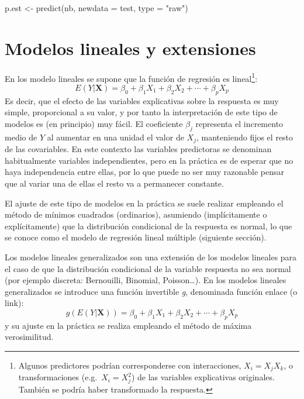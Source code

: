 \documentclass[
]{book}
\newenvironment{Shaded}{\begin{snugshade}}{\end{snugshade}}
\newcommand{\AttributeTok}[1]{\textcolor[rgb]{0.77,0.63,0.00}{#1}}
\newcommand{\FunctionTok}[1]{\textcolor[rgb]{0.00,0.00,0.00}{#1}}
\newcommand{\NormalTok}[1]{#1}
\newcommand{\OtherTok}[1]{\textcolor[rgb]{0.56,0.35,0.01}{#1}}
\newcommand{\StringTok}[1]{\textcolor[rgb]{0.31,0.60,0.02}{#1}}
\theoremstyle{break}
\theoremstyle{definition}
\theoremstyle{definition}
\theoremstyle{definition}
\theoremstyle{definition}
\theoremstyle{remark}
\begin{document}
\begin{Shaded}
\begin{Highlighting}[]
\NormalTok{p.est }\OtherTok{\textless{}{-}} \FunctionTok{predict}\NormalTok{(nb, }\AttributeTok{newdata =}\NormalTok{ test, }\AttributeTok{type =} \StringTok{"raw"}\NormalTok{)}
\end{Highlighting}
\end{Shaded}

\hypertarget{modelos-lineales}{%
\chapter{Modelos lineales y extensiones}\label{modelos-lineales}}

En los modelo lineales se supone que la función de regresión es lineal\footnote{Algunos predictores podrían corresponderse con interacciones, \(X_i = X_j X_k\), o transformaciones (e.g.~\(X_i = X_j^2\)) de las variables explicativas originales. También se podría haber transformado la respuesta.}:
\[E( Y | \mathbf{X} ) = \beta_{0}+\beta_{1}X_{1}+\beta_{2}X_{2}+\cdots+\beta_{p}X_{p}\]
Es decir, que el efecto de las variables explicativas sobre la respuesta es muy simple, proporcional a su valor, y por tanto la interpretación de este tipo de modelos es (en principio) muy fácil.
El coeficiente \(\beta_j\) representa el incremento medio de \(Y\) al aumentar en una unidad el valor de \(X_j\), manteniendo fijos el resto de las covariables.
En este contexto las variables predictoras se denominan habitualmente variables independientes, pero en la práctica es de esperar que no haya independencia entre ellas, por lo que puede no ser muy razonable pensar que al variar una de ellas el resto va a permanecer constante.

El ajuste de este tipo de modelos en la práctica se suele realizar empleando el método de mínimos cuadrados (ordinarios), asumiendo (implícitamente o explícitamente) que la distribución condicional de la respuesta es normal, lo que se conoce como el modelo de regresión lineal múltiple (siguiente sección).

Los modelos lineales generalizados son una extensión de los modelos lineales para el caso de que la distribución condicional de la variable respuesta no sea normal (por ejemplo discreta: Bernouilli, Binomial, Poisson\ldots).
En los modelos lineales generalizados se introduce una función invertible \emph{g}, denominada función enlace (o link):
\[g\left(E(Y | \mathbf{X} )\right) = \beta_{0}+\beta_{1}X_{1}+\beta_{2}X_{2}+\cdots+\beta_{p}X_{p}\]
y su ajuste en la práctica se realiza empleando el método de máxima verosimilitud.
\end{document}

